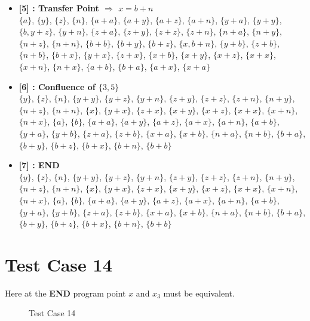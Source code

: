 \begin{itemize}
    \item \textbf{[5] : Transfer Point $\Rightarrow$ $x = b + n$}\\
        $\{a\}$, $\{y\}$, $\{z\}$, $\{n\}$, $\{a + a\}$, $\{a + y\}$, $\{a + z\}$, $\{a + n\}$, $\{y + a\}$, $\{y + y\}$, $\{b, y + z\}$, $\{y + n\}$, $\{z + a\}$, $\{z + y\}$, $\{z + z\}$, $\{z + n\}$, $\{n + a\}$, $\{n + y\}$, $\{n + z\}$, $\{n + n\}$, $\{b + b\}$, $\{b + y\}$, $\{b + z\}$, $\{x, b + n\}$, $\{y + b\}$, $\{z + b\}$, $\{n + b\}$, $\{b + x\}$, $\{y + x\}$, $\{z + x\}$, $\{x + b\}$, $\{x + y\}$, $\{x + z\}$, $\{x + x\}$, $\{x + n\}$, $\{n + x\}$, $\{a + b\}$, $\{b + a\}$, $\{a + x\}$, $\{x + a\}$

    \item \textbf{[6] : Confluence of $\{3, 5\}$}\\
        $\{y\}$, $\{z\}$, $\{n\}$, $\{y + y\}$, $\{y + z\}$, $\{y + n\}$, $\{z + y\}$, $\{z + z\}$, $\{z + n\}$, $\{n + y\}$, $\{n + z\}$, $\{n + n\}$, $\{x\}$, $\{y + x\}$, $\{z + x\}$, $\{x + y\}$, $\{x + z\}$, $\{x + x\}$, $\{x + n\}$, $\{n + x\}$, $\{a\}$, $\{b\}$, $\{a + a\}$, $\{a + y\}$, $\{a + z\}$, $\{a + x\}$, $\{a + n\}$, $\{a + b\}$, $\{y + a\}$, $\{y + b\}$, $\{z + a\}$, $\{z + b\}$, $\{x + a\}$, $\{x + b\}$, $\{n + a\}$, $\{n + b\}$, $\{b + a\}$, $\{b + y\}$, $\{b + z\}$, $\{b + x\}$, $\{b + n\}$, $\{b + b\}$

    \item \textbf{[7] : END}\\
        $\{y\}$, $\{z\}$, $\{n\}$, $\{y + y\}$, $\{y + z\}$, $\{y + n\}$, $\{z + y\}$, $\{z + z\}$, $\{z + n\}$, $\{n + y\}$, $\{n + z\}$, $\{n + n\}$, $\{x\}$, $\{y + x\}$, $\{z + x\}$, $\{x + y\}$, $\{x + z\}$, $\{x + x\}$, $\{x + n\}$, $\{n + x\}$, $\{a\}$, $\{b\}$, $\{a + a\}$, $\{a + y\}$, $\{a + z\}$, $\{a + x\}$, $\{a + n\}$, $\{a + b\}$, $\{y + a\}$, $\{y + b\}$, $\{z + a\}$, $\{z + b\}$, $\{x + a\}$, $\{x + b\}$, $\{n + a\}$, $\{n + b\}$, $\{b + a\}$, $\{b + y\}$, $\{b + z\}$, $\{b + x\}$, $\{b + n\}$, $\{b + b\}$

\end{itemize}

\section{Test Case 14}
\label{sec:tc14}
Here at the \textbf{END} program point $x$ and $x_3$ must be equivalent.

\begin{figure}[H]
\label{fig:tc14}
    \caption{Test Case 14}
\end{figure}


